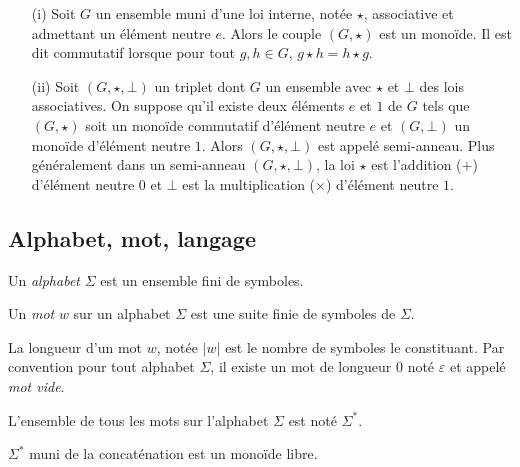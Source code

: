 \begin{Def}
\begin{itemize}
\item[(i)]Soit $G$ un ensemble muni d'une loi interne, notée $\star$, associative et admettant un élément neutre $e$. Alors le couple  $(G,\star)$ est un monoïde. Il est dit commutatif lorsque pour tout $g, h\in G$, $g\star h=h\star g$.

\item[(ii)] Soit $(G,\star, \bot)$ un triplet dont $G$ un ensemble avec   $\star$ et $\bot$  des lois associatives. On suppose qu'il existe deux éléments $e$ et $1$ de $G$ tels que $(G,\star)$ soit un monoïde commutatif d'élément neutre $e$ et $(G,\bot)$ un monoïde d'élément neutre $1$. Alors $(G,\star, \bot)$ est appelé semi-anneau. Plus généralement dans un semi-anneau $(G,\star, \bot)$, la loi $\star$ est l'addition ($+$)  d'élément neutre $0$ et $\bot$ est la multiplication ($\times$) d'élément neutre $1$.
\end{itemize}
\end{Def}
\begin{spacing}{0.30}
\subsection{Alphabet, mot, langage}\label{defaut1}
\end{spacing}
 Un \emph{alphabet} $\Sigma$ est un ensemble fini de symboles.
 
 Un \emph{mot} $w$ sur un alphabet $\Sigma$ est une suite finie de symboles de $\Sigma$.
 
 La longueur d'un mot $w$, notée $\vert w\vert$ est le nombre de symboles le  constituant. Par convention pour tout alphabet $\Sigma$, il existe un mot de longueur $0$ noté $\varepsilon$ et  appelé \emph{mot vide}.
 
 L'ensemble de tous les mots sur l'alphabet $\Sigma$ est noté $\Sigma^{*}.$
 
 $\Sigma^{*}$ muni de la concaténation est un monoïde libre.
 
